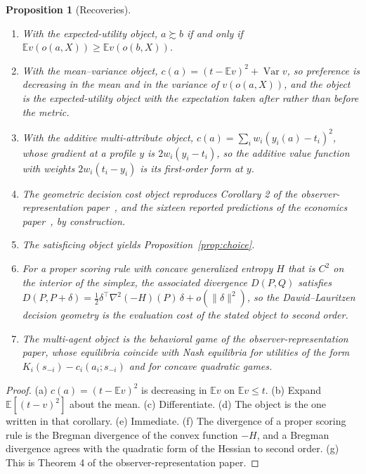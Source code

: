 \documentclass[11pt]{article}
\newtheorem{proposition}{Proposition}
\theoremstyle{definition}
\theoremstyle{remark}
\newcommand{\Ex}{\mathbb{E}}
\begin{document}
\begin{proposition}[Recoveries]
\label{prop:classical}
\begin{enumerate}
\item[(a)] With the expected-utility object, $a\succsim b$ if and only if $\Ex v(o(a,X))\ge\Ex v(o(b,X))$.
\item[(b)] With the mean--variance object, $c(a)=(t-\Ex v)^{2}+\operatorname{Var}v$, so preference is decreasing in the mean and in the variance of $v(o(a,X))$, and the object is the expected-utility object with the expectation taken after rather than before the metric.
\item[(c)] With the additive multi-attribute object, $c(a)=\sum_{i}w_{i}(y_{i}(a)-t_{i})^{2}$, whose gradient at a profile $y$ is $2w_{i}(y_{i}-t_{i})$, so the additive value function with weights $2w_{i}(t_{i}-y_{i})$ is its first-order form at $y$.
\item[(d)] The geometric decision cost object reproduces Corollary 2 of the observer-representation paper~\cite{bond2026or}, and the sixteen reported predictions of the economics paper~\cite{bond2026tcss}, by construction.
\item[(e)] The satisficing object yields Proposition~\ref{prop:choice}.
\item[(f)] For a proper scoring rule with concave generalized entropy $H$ that is $C^{2}$ on the interior of the simplex, the associated divergence $D(P,Q)$ satisfies $D(P,P+\delta)=\tfrac12\delta^{\top}\nabla^{2}(-H)(P)\,\delta+o(\|\delta\|^{2})$, so the Dawid--Lauritzen decision geometry is the evaluation cost of the stated object to second order.
\item[(g)] The multi-agent object is the behavioral game of the observer-representation paper, whose equilibria coincide with Nash equilibria for utilities of the form $K_{i}(s_{-i})-c_{i}(a_{i};s_{-i})$ and for concave quadratic games.
\end{enumerate}
\end{proposition}

\begin{proof}
(a) $c(a)=(t-\Ex v)^{2}$ is decreasing in $\Ex v$ on $\Ex v\le t$.
(b) Expand $\Ex[(t-v)^{2}]$ about the mean.
(c) Differentiate.
(d) The object is the one written in that corollary.
(e) Immediate.
(f) The divergence of a proper scoring rule is the Bregman divergence of the convex function $-H$, and a Bregman divergence agrees with the quadratic form of the Hessian to second order.
(g) This is Theorem 4 of the observer-representation paper.
\end{proof}
\end{document}
